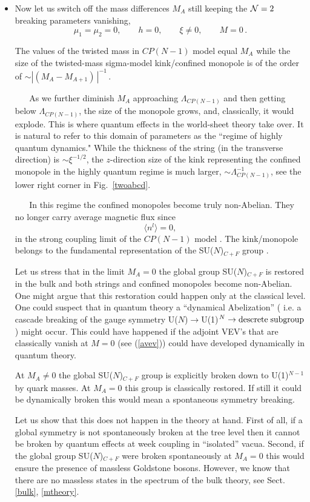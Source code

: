 \documentclass[epsfig,12pt]{article}
\def\beq{\begin{equation}}
\def\eeq{\end{equation}}
\newcommand{\ntwo}{${\cal N}=2\;$}
\begin{document}
\begin{itemize}
\item 
Now let us switch off the mass differences $M_A$ still keeping the \ntwo breaking 
parameters vanishing,
\beq
\mu_1=\mu_2=0,\qquad h=0, \qquad \xi\neq 0, \qquad M = 0 \,.
\label{stage3}
\eeq

The values of the twisted mass in $CP(N-1)$ model equal $M_A$ while the
size of the twisted-mass sigma-model kink/confined monopole
is of the order of  $\sim \left|(M_A-M_{A+1}) \,\right| ^{-1}\,$.

\mbox{} \,\,\,\,\,\,\,\, As we further diminish $M_A$
approaching $\Lambda_{CP(N-1)}$ and then getting  below  $\Lambda_{CP(N-1)}$,
the size of the monopole grows, and, classically, it would explode.
This is where quantum effects in the world-sheet theory take over.
It is natural to refer to this domain of parameters as the ``regime of
highly quantum dynamics."
While the thickness of the string (in the transverse direction) is
$\sim \xi ^{-1/2}$, the
$z$-direction size of the kink  representing the confined
monopole in the highly quantum regime is much larger, $\sim
\Lambda_{CP(N-1)}^{-1}$, see the  lower right corner in  Fig.~\ref{twoabcd}. 

\mbox{} \,\,\,\,\,\,\,\, In this regime the confined monopoles become truly
non-Abelian. They  no longer carry average magnetic flux since
\beq
\langle n^l\rangle =0,
\label{nvev}
\eeq
in the strong coupling limit of the $CP(N-1)$ model \cite{W79}. The kink/monopole
belongs to the fundamental representation of the SU($N$)$_{C+F}$ 
group \cite{W79,HoVa}.

Let us stress that in the limit $M_A=0$ the global group SU($N$)$_{C+F}$ is restored
in the bulk and both strings and confined monopoles become non-Abelian. One might argue
 that this restoration could happen  only at the classical level.
 One could suspect that in quantum theory a
``dynamical Abelization'' ( i.e. a cascade
breaking of the gauge symmetry U($N$)$\to$U(1)$^{N} \to {\rm descrete\; subgroup}$ )
might occur. This could have happened if the  adjoint VEV's  that are classically 
vanish at $M=0$ 
(see (\ref{avev}))  could have developed  dynamically in quantum theory.

 At $M_A\ne 0$ the global SU($N$)$_{C+F}$
group is explicitly broken down  to U(1)$^{N-1}$ by quark masses. At $M_A=0$ this
group is classically restored. If still it could be dynamically broken 
this would mean a spontaneous symmetry breaking.

Let us show that this does not happen in the theory at hand. First of all,
 if a global symmetry is not spontaneously broken at the tree level then 
it cannot be broken
by quantum effects at  week coupling in ``isolated'' vacua. Second, if the 
global group SU($N$)$_{C+F}$ 
were
broken spontaneously at $M_A=0$ this would ensure the presence of massless Goldstone
bosons. However, we know that there are no massless states in the spectrum of the bulk
theory, see Sect. \ref{bulk}, \ref{mtheory}. 


\end{itemize}
\end{document}
